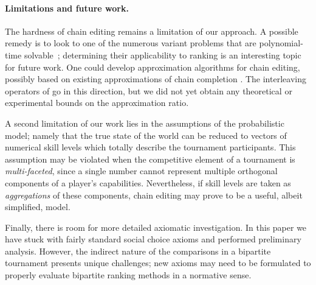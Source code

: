 \paragraph{Limitations and future work.}
%
The hardness of chain editing remains a limitation of our approach. A possible
remedy is to look to one of the numerous variant problems that are
polynomial-time solvable~\cite{jiao2017algorithms}; determining their
applicability to ranking is an interesting topic for future work. One could
develop approximation algorithms for chain editing, possibly based on existing
approximations of chain completion \cite{natanzon2000polynomial}. The
interleaving operators of  go in this direction, but we
did not yet obtain any theoretical or experimental bounds on the approximation
ratio.

A second limitation of our work lies in the assumptions of the probabilistic
model; namely that the true state of the world can be reduced to vectors of
numerical skill levels which totally describe the tournament participants. This
assumption may be violated when the competitive element of a tournament is
\emph{multi-faceted}, since a single number cannot represent multiple
orthogonal components of a player's capabilities. Nevertheless, if skill levels
are taken as \emph{aggregations} of these components, chain editing may prove
to be a useful, albeit simplified, model.

Finally, there is room for more detailed axiomatic investigation. In this paper
we have stuck with fairly standard social choice axioms and performed
preliminary analysis. However, the indirect nature of the comparisons in a
bipartite tournament presents unique challenges; new axioms may need to be
formulated to properly evaluate bipartite ranking methods in a normative
sense.
